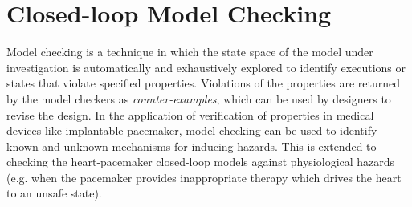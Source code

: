 
\chapter{Closed-loop Model Checking}
\label{ModelChecking}
%

Model checking is a technique in which the state space of the model under investigation is automatically and exhaustively explored to identify executions or states that violate specified properties. Violations of the properties are returned by the model checkers as \emph{counter-examples}, which can be used by designers to revise the design. In the application of verification of properties in medical devices like implantable pacemaker, model checking can be used to identify known and unknown mechanisms for inducing hazards. This is extended to checking the heart-pacemaker closed-loop models against physiological hazards (e.g. when the pacemaker provides inappropriate therapy which drives the heart to an unsafe state). 

